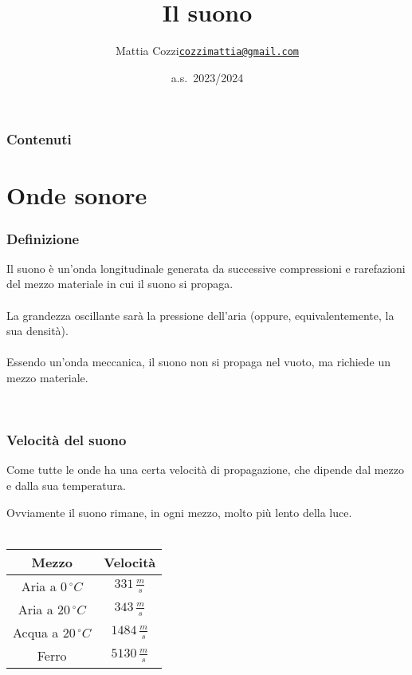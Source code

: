 \documentclass[]{beamer}
\title{Il suono}
\author{\texorpdfstring{Mattia Cozzi\newline\href{mailto:cozzimattia@gmail.com}{\texttt{cozzimattia@gmail.com}}}{Mattia Cozzi}}
\date{a.s.~2023/2024}
\theoremstyle{plain}
\begin{document}
\begin{frame}
  \titlepage
\end{frame}





\begin{frame}
\frametitle{Contenuti}
\tableofcontents
\end{frame}


\section{Onde sonore}


\begin{frame}
\frametitle{Definizione}
Il suono è un'\alert<1>{onda longitudinale} generata da successive compressioni e rarefazioni del mezzo materiale in cui il suono si propaga.\\\pause~\\La grandezza oscillante sarà la \alert<2>{pressione dell'aria} (oppure, equivalentemente, la sua densità).\\~\\\pause
Essendo un'onda meccanica, il suono non si propaga nel vuoto, ma \alert<3>{richiede un mezzo materiale}.
\begin{center}
\href{gif/suono1.gif}{}~~~~~~~~~~\href{gif/suono2.gif}{}
\end{center}
\end{frame}



\begin{frame}
\frametitle{Velocità del suono}
Come tutte le onde ha una certa velocità di propagazione, che \alert{dipende dal mezzo e dalla sua temperatura}.

Ovviamente il suono rimane, in ogni mezzo, molto più lento della luce.\\~

\centering
  \begin{tabular}{c|c}
    \textbf{Mezzo} & \textbf{Velocità} \\\hline\rule{0pt}{3ex}
    Aria a $ 0\,{}^\circ C $ & $ 331 \, \frac{m}{s} $ \\\rule{0pt}{3ex}
    Aria a $ 20 \,{}^\circ C$ & $ 343 \, \frac{m}{s} $ \\\rule{0pt}{3ex}
    Acqua a $ 20\,{}^\circ C $ & $ 1484 \, \frac{m}{s} $ \\\rule{0pt}{3ex}
    Ferro & $ 5130 \, \frac{m}{s} $\\
  \end{tabular}
\end{frame}
\end{document}
